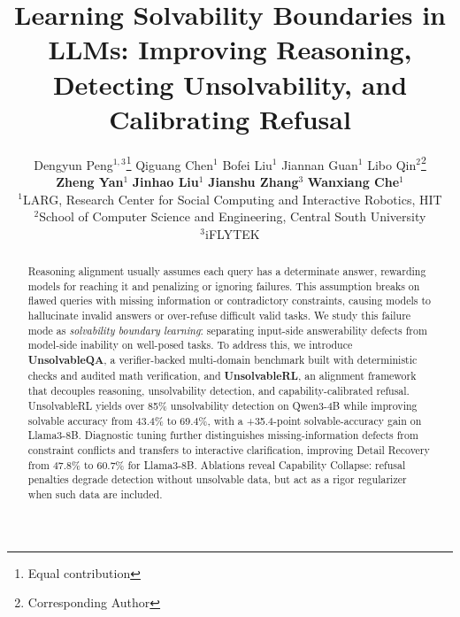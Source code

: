 \documentclass[11pt]{article}
\title{Learning Solvability Boundaries in LLMs: Improving Reasoning, Detecting Unsolvability, and Calibrating Refusal}
\author{
 Dengyun Peng$^{1,3}$\thanks{Equal contribution} \quad %
 Qiguang Chen$^{1}$\footnotemark[1] \quad
 Bofei Liu$^{1}$ \quad
 Jiannan Guan$^{1}$ \quad 
 Libo Qin$^{2}$\thanks{Corresponding Author} \\
 \textbf{Zheng Yan}$^{1}$ \quad
\textbf{Jinhao Liu}$^{1}$ \quad
\textbf{Jianshu Zhang}$^{3}$ \quad %
 \textbf{Wanxiang Che$^{1}$}\footnotemark[2] \\[2mm]
 $^{1}$LARG, Research Center for Social Computing and Interactive Robotics, HIT \\
 $^{2}$School of Computer Science and Engineering, Central South University \\
 $^{3}$iFLYTEK %
}
\begin{document}
\maketitle
\thispagestyle{fancy}
\pagestyle{fancy}
\begin{abstract}
Reasoning alignment usually assumes each query has a determinate answer, rewarding models for reaching it and penalizing or ignoring failures. This assumption breaks on flawed queries with missing information or contradictory constraints, causing models to hallucinate invalid answers or over-refuse difficult valid tasks. We study this failure mode as \textit{solvability boundary learning}: separating input-side answerability defects from model-side inability on well-posed tasks. To address this, we introduce \textbf{UnsolvableQA}, a verifier-backed multi-domain benchmark built with deterministic checks and audited math verification, and \textbf{UnsolvableRL}, an alignment framework that decouples reasoning, unsolvability detection, and capability-calibrated refusal. UnsolvableRL yields over 85\% unsolvability detection on Qwen3-4B while improving solvable accuracy from 43.4\% to 69.4\%, with a +35.4-point solvable-accuracy gain on Llama3-8B. Diagnostic tuning further distinguishes missing-information defects from constraint conflicts and transfers to interactive clarification, improving Detail Recovery from 47.8\% to 60.7\% for Llama3-8B. Ablations reveal Capability Collapse: refusal penalties degrade detection without unsolvable data, but act as a rigor regularizer when such data are included.
\end{abstract}


% 










\appendix


\label{sec:appendix}
\end{document}
